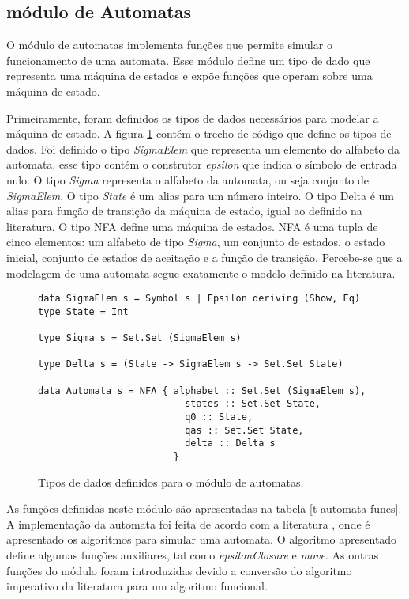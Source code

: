 \subsection{módulo de Automatas}

O módulo de automatas implementa funções que permite simular o funcionamento de uma automata.
Esse módulo define um tipo de dado que representa uma máquina de estados e expõe funções que operam sobre uma máquina de estado.

Primeiramente, foram definidos os tipos de dados necessários para modelar a máquina de estado.
A figura \ref{f-data-automata} contém o trecho de código que define os tipos de dados.
Foi definido o tipo \emph{SigmaElem} que representa um elemento do alfabeto da automata, esse tipo contém o construtor \emph{epsilon} que indica o símbolo de entrada nulo.
O tipo \emph{Sigma} representa o alfabeto da automata, ou seja conjunto de \emph{SigmaElem}.
O tipo \emph{State} é um alias para um número inteiro.
O tipo Delta é um alias para função de transição da máquina de estado, igual ao definido na literatura.
O tipo NFA define uma máquina de estados.
NFA é uma tupla de cinco elementos: um alfabeto de tipo \emph{Sigma}, um conjunto de estados, o estado inicial, conjunto de estados de aceitação e a função de transição.
Percebe-se que a modelagem de uma automata segue exatamente o modelo definido na literatura.

\begin{figure}
\begin{lstlisting}
data SigmaElem s = Symbol s | Epsilon deriving (Show, Eq)
type State = Int

type Sigma s = Set.Set (SigmaElem s)

type Delta s = (State -> SigmaElem s -> Set.Set State)

data Automata s = NFA { alphabet :: Set.Set (SigmaElem s),
                          states :: Set.Set State,
                          q0 :: State,
                          qas :: Set.Set State,
                          delta :: Delta s
                        }
\end{lstlisting}
\caption{Tipos de dados definidos para o módulo de automatas.}
\label{f-data-automata}
\end{figure}



As funções definidas neste módulo são apresentadas na tabela \ref{t-automata-funcs}.
A implementação da automata foi feita de acordo com a literatura \cite{dragon-book}, onde é apresentado os algoritmos para simular uma automata.
O algoritmo apresentado define algumas funções auxiliares, tal como \emph{epsilonClosure} e \emph{move}.
As outras funções do módulo foram introduzidas devido a conversão do algoritmo imperativo da literatura para um algoritmo funcional.

